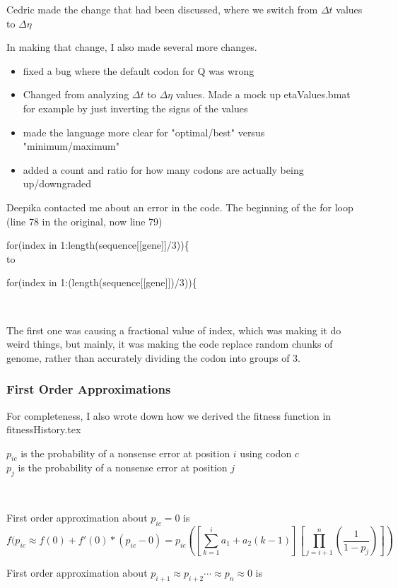 \documentclass[11pt]{article} %
\begin{document}
Cedric made the change that had been discussed, where we switch from $\Delta t$ values to $\Delta\eta$

In making that change, I also made several more changes.

\begin{itemize}
\item fixed a bug where the default codon for Q was wrong
\item Changed from analyzing $\Delta t$ to $\Delta\eta$ values. Made a mock up etaValues.bmat for example by just inverting the signs of the values
\item made the language more clear for "optimal/best" versus "minimum/maximum"
\item added a count and ratio for how many codons are actually being up/downgraded
\end{itemize}

Deepika contacted me about an error in the code. The beginning of the for loop (line 78 in the original, now line 79)

for(index in 1:length(sequence[[gene]]/3))\{
\\to

for(index in 1:(length(sequence[[gene]])/3))\{

~

The first one was causing a fractional value of index, which was making it do weird things, but mainly, it was making the code replace random chunks of genome, rather than accurately dividing the codon into groups of 3.


\subsubsection{First Order Approximations}

For completeness, I also wrote down how we derived the fitness function in fitnessHistory.tex


$p_{ic}$ is the probability of a nonsense error at position $i$ using codon $c$
\\ $p_j$ is the probability of a nonsense error at position $j$

~

First order approximation about $p_{ic} = 0$ is
$$f(p_{ic} \approx f(0) + f'(0)*(p_{ic}-0)
= p_{ic}\left(
\left[\sum_{k=1}^{i} a_1 + a_2(k-1)\right]
\left[\prod_{j=i+1}^{n}(\frac{1}{1-p_{j}})\right]
\right)
$$


First order approximation about $p_{i+1} \approx p_{i+2} \cdots \approx p_{n} \approx 0$ is
\end{document}
